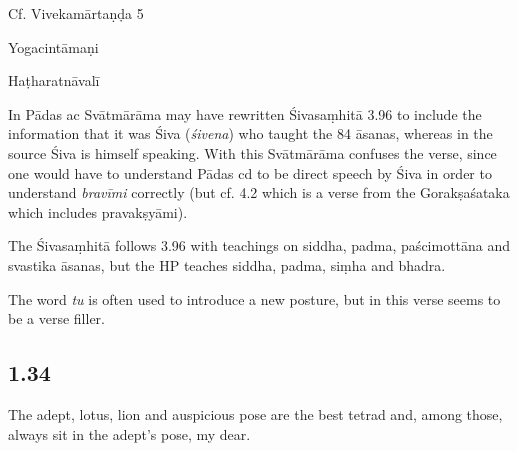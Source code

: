 \begin{ekdosis}
\begin{sources}[hp01_033]
Cf. Vivekamārtaṇḍa 5

\begin{versinnote}
\end{versinnote}

\end{sources}

\begin{testimonia}[hp01_033]
Yogacintāmaṇi

\begin{versinnote}
\end{versinnote}

Haṭharatnāvalī

\begin{versinnote}
\end{versinnote}

\end{testimonia}

\begin{philcomm}[hp01_033]
In Pādas ac Svātmārāma may have rewritten Śivasaṃhitā 3.96 to include the information that it was Śiva (\emph{śivena}) who taught the 84 āsanas, whereas in the source Śiva is himself speaking. With this
Svātmārāma confuses the verse, since one would have to understand Pādas cd to be direct speech by Śiva in order to understand \emph{bravīmi} correctly (but cf. 4.2 which is a verse from the Gorakṣaśataka which includes pravakṣyāmi).

The Śivasaṃhitā follows 3.96 with teachings on siddha, padma, paścimottāna and svastika āsanas, but the HP teaches siddha, padma, siṃha and bhadra.

The word \emph{tu} is often used to introduce a new posture, but in this verse seems to be a verse filler.
\end{philcomm}

\subsection*{1.34}
\begin{translation}[hp01_034]
The adept, lotus, lion and auspicious pose are the best tetrad and, among those, always sit in the adept’s pose, my dear.
\end{translation}


\end{ekdosis}
